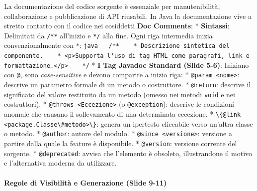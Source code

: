 \documentclass[11pt,a4paper]{article}
\newcommand{\passthrough}[1]{#1}
\begin{document}
La documentazione del codice sorgente è essenziale per manutenibilità,
collaborazione e pubblicazione di API riusabili. In Java la
documentazione vive a stretto contatto con il codice nei cosiddetti
\textbf{Doc Comments}: * \textbf{Sintassi}: Delimitati da
\passthrough{\lstinline!/**!} all'inizio e \passthrough{\lstinline!*/!}
alla fine. Ogni riga intermedia inizia convenzionalmente con
\passthrough{\lstinline!*!}:
\passthrough{\lstinline!java   /**    * Descrizione sintetica del componente.    * <p>Supporta l'uso di tag HTML come paragrafi, link e formattazione.</p>    */!}
* \textbf{I Tag Javadoc Standard (Slide 5-6)}: Iniziano con
\passthrough{\lstinline!@!}, sono \emph{case-sensitive} e devono
comparire a inizio riga: * \passthrough{\lstinline!@param <nome>!}:
descrive un parametro formale di un metodo o costruttore. *
\passthrough{\lstinline!@return!}: descrive il significato del valore
restituito da un metodo (omesso nei metodi
\passthrough{\lstinline!void!} e nei costruttori). *
\passthrough{\lstinline!@throws <Eccezione>!} (o
\passthrough{\lstinline!@exception!}): descrive le condizioni anomale
che causano il sollevamento di una determinata eccezione. *
\passthrough{\lstinline!\{@link <package.Classe\#metodo>\}!}: genera un
ipertesto cliccabile verso un'altra classe o metodo. *
\passthrough{\lstinline!@author!}: autore del modulo. *
\passthrough{\lstinline!@since <versione>!}: versione a partire dalla
quale la feature è disponibile. * \passthrough{\lstinline!@version!}:
versione corrente del sorgente. * \passthrough{\lstinline!@deprecated!}:
avvisa che l'elemento è obsoleto, illustrandone il motivo e
l'alternativa moderna da utilizzare.

\paragraph{Regole di Visibilità e Generazione (Slide
9-11)}\label{regole-di-visibilituxe0-e-generazione-slide-9-11}
\end{document}
